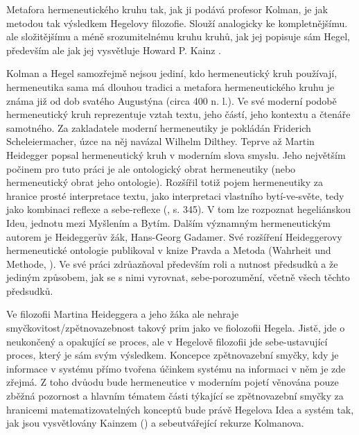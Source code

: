 \documentclass[11pt,a4paper]{article}
\begin{document}
Metafora hermeneutického kruhu tak, jak ji podává profesor Kolman, je jak metodou tak výsledkem Hegelovy filozofie. Slouží analogicky ke kompletnějšímu. ale složitějšímu a méně srozumitelnému kruhu kruhů, jak jej popisuje sám Hegel, především ale jak jej vysvětluje Howard P. Kainz \cite*{kainz_paradox_1988}.

Kolman a Hegel samozřejmě nejsou jediní, kdo hermeneutický kruh používají, hermeneutika sama má dlouhou tradici a metafora hermeneutického kruhu je známa již od dob svatého Augustýna (circa 400 n. l.). Ve své moderní podobě hermeneutický kruh reprezentuje vztah textu, jeho částí, jeho kontextu a čtenáře samotného. Za zakladatele moderní hermeneutiky je pokládán Friderich Scheleiermacher, úzce na něj navázal Wilhelm Dilthey. Teprve až Martin Heidegger popsal hermeneutický kruh v moderním slova smyslu. Jeho největším počinem pro tuto práci je ale ontologický obrat hermeneutiky (nebo hermeneutický obrat jeho ontologie). Rozšířil totiž pojem hermeneutiky za hranice prosté interpretace textu, jako interpretaci vlastního bytí-ve-světe, tedy jako kombinaci reflexe a sebe-reflexe (\cite{stocker_palgrave_2018}, s. 345). V tom lze rozpoznat hegeliánskou Ideu, jednotu mezi Myšlením a Bytím. Dalším významným hermeneutickým autorem je Heideggerův žák, Hans-Georg Gadamer. Své rozšíření Heideggerovy hermeneutické ontologie publikoval v knize Pravda a Metoda (Wahrheit und Methode, \cite*{gadamer_wahrheit_1975}). Ve své práci zdrůazňoval především roli a nutnost předsudků a že jediným způsobem, jak se s nimi vyrovnat, sebe-porozumění, včetně všech těchto předsudků. 

Ve filozofii Martina Heideggera a jeho žáka ale nehraje smyčkovitost/zpětnovazebnost takový prim jako ve fiolozofii Hegela. Jistě, jde o neukončený a opakující se proces, ale v Hegelově filozofii jde sebe-ustavující proces, který je sám svým výsledkem. Koncepce zpětnovazební smyčky, kdy je informace v systému přímo tvořena účinkem systému na informaci v něm je zde zřejmá. Z toho dvůodu bude hermeneutice v moderním pojetí věnována pouze zběžná pozornost a hlavním tématem části týkající se zpětnovazební smyčky za hranicemi matematizovatelných konceptů bude právě Hegelova Idea a systém tak, jak jsou vysvětlovány Kainzem (\cite*{kainz_paradox_1988}) a sebeutvářející rekurze Kolmanova.
\end{document}
